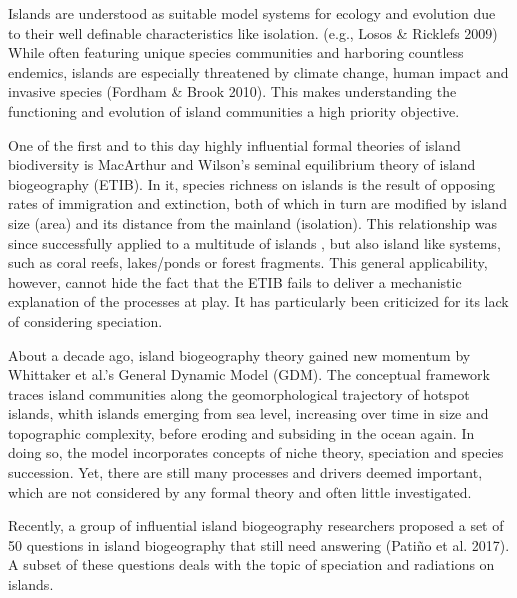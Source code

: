 \documentclass[a4paper]{scrartcl}
\begin{document}
Islands are understood as suitable model systems for ecology and evolution due to their well definable characteristics like isolation. (e.g., Losos \& Ricklefs 2009) %
While often featuring unique species communities and harboring countless endemics, %
islands are especially threatened by climate change, human impact and invasive species (Fordham \& Brook 2010). %
This makes understanding the functioning and evolution of island communities a high priority objective.

One of the first and to this day highly influential formal theories of island biodiversity is MacArthur and Wilson's seminal equilibrium theory of island biogeography (ETIB). %
In it, species richness on islands is the result of opposing rates of immigration and extinction, both of which in turn are modified by island size (area) and its distance from the mainland (isolation).
This relationship was since successfully applied to a multitude of islands %
, but also island like systems, such as coral reefs, lakes/ponds or forest fragments. %
This general applicability, however, cannot hide the fact that the ETIB fails to deliver a mechanistic explanation of the processes at play.
It has particularly been criticized for its lack of considering speciation. %

About a decade ago, island biogeography theory gained new momentum by Whittaker et al.'s General Dynamic Model (GDM). %
The conceptual framework traces island communities along the geomorphological trajectory of hotspot islands,
whith islands emerging from sea level, increasing over time in size and topographic complexity, before eroding and subsiding in the ocean again.
In doing so, the model incorporates concepts of niche theory, speciation and species succession.
Yet, there are still many processes and drivers deemed important, which are not considered by any formal theory and often little investigated.

Recently, a group of influential island biogeography researchers proposed a set of 50 questions in island biogeography that still need answering (Patiño et al. 2017).
A subset of these questions deals with the topic of speciation and radiations on islands.
\end{document}
